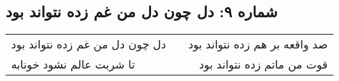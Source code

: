 \begin{center}
\section*{شماره ۹: دل چون دل من غم زده نتواند بود}
\label{sec:009}
\begin{longtable}{l p{0.5cm} r}
دل چون دل من غم زده نتواند بود
&&
صد واقعه بر هم زده نتواند بود
\\
تا شربت عالم نشود خونابه
&&
قوت من ماتم زده نتواند بود
\\
\end{longtable}
\end{center}
